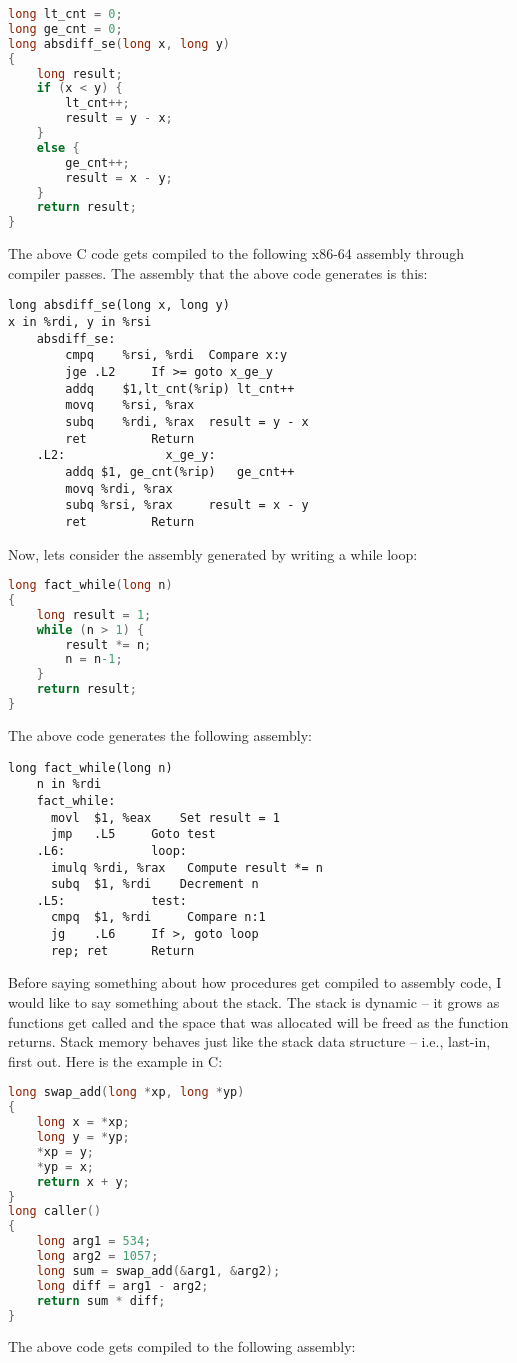 \documentclass[10pt]{article}
\begin{document}
\begin{lstlisting}[language=C]
long lt_cnt = 0;
long ge_cnt = 0;
long absdiff_se(long x, long y)
{
	long result;
	if (x < y) {
		lt_cnt++;
		result = y - x;
	}
	else {
		ge_cnt++;
		result = x - y;
	}
	return result;
}

\end{lstlisting} 
The above C code gets compiled to the following x86-64 assembly through compiler passes. The assembly that the above code generates is this: 

\begin{lstlisting}
long absdiff_se(long x, long y)
x in %rdi, y in %rsi
	absdiff_se:
		cmpq	%rsi, %rdi	Compare x:y
		jge	.L2		If >= goto x_ge_y
		addq	$1,lt_cnt(%rip)	lt_cnt++
		movq	%rsi, %rax
		subq	%rdi, %rax	result = y - x
		ret			Return
	.L2:			  x_ge_y:
		addq $1, ge_cnt(%rip)	ge_cnt++
		movq %rdi, %rax
		subq %rsi, %rax		result = x - y
		ret			Return

\end{lstlisting}
Now, lets consider the assembly generated by writing a while loop: 

\begin{lstlisting}[language=C]
long fact_while(long n)
{
	long result = 1;
	while (n > 1) {
		result *= n;
		n = n-1;
	}
	return result;
}

\end{lstlisting}
The above code generates the following assembly:

\begin{lstlisting}
long fact_while(long n)
	n in %rdi
	fact_while:
	  movl	$1, %eax	Set result = 1
	  jmp	.L5		Goto test
	.L6:		    loop:
	  imulq	%rdi, %rax	 Compute result *= n
	  subq	$1, %rdi	Decrement n
	.L5:		    test:
	  cmpq	$1, %rdi	 Compare n:1
	  jg	.L6		If >, goto loop
	  rep; ret		Return
\end{lstlisting}
Before saying something about how procedures get compiled to assembly code, I would like to say something about the stack. The stack is dynamic -- it grows as functions get called and the space that was allocated will be freed as the function returns. Stack memory behaves just like the stack data structure -- i.e., last-in, first out. 
Here is the example in C:

\begin{lstlisting}[language=C]
long swap_add(long *xp, long *yp)
{
	long x = *xp;
	long y = *yp;
	*xp = y;
	*yp = x;
	return x + y;
}
long caller()
{
	long arg1 = 534;
	long arg2 = 1057;
	long sum = swap_add(&arg1, &arg2);
	long diff = arg1 - arg2;
	return sum * diff;
}
\end{lstlisting}
The above code gets compiled to the following assembly: 
\end{document}

